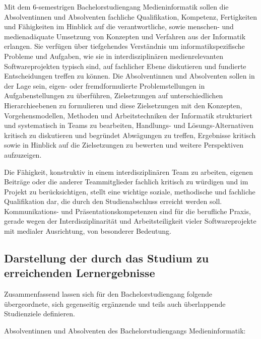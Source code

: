 Mit dem 6-semestrigen Bachelorstudiengang Medieninformatik sollen die
Absolventinnen und Absolventen fachliche Qualifikation, Kompetenz,
Fertigkeiten und Fähigkeiten im Hinblick auf die verantwortliche, sowie
menschen- und medienadäquate Umsetzung von Konzepten und Verfahren aus
der Informatik erlangen. Sie verfügen über tiefgehendes Verständnis um
informatikspezifische Probleme und Aufgaben, wie sie in
interdisziplinären medienrelevanten Softwareprojekten typisch sind, auf
fachlicher Ebene diskutieren und fundierte Entscheidungen treffen zu
können. Die Absolventinnen und Absolventen sollen in der Lage sein,
eigen- oder fremdformulierte Problemstellungen in Aufgabenstellungen zu
überführen, Zielsetzungen auf unterschiedlichen Hierarchieebenen zu
formulieren und diese Zielsetzungen mit den Konzepten,
Vorgehensmodellen, Methoden und Arbeitstechniken der Informatik
strukturiert und systematisch in Teams zu bearbeiten, Handlungs- und
Lösungs-Alternativen kritisch zu diskutieren und begründet Abwägungen zu
treffen, Ergebnisse kritisch sowie in Hinblick auf die Zielsetzungen zu
bewerten und weitere Perspektiven aufzuzeigen.

Die Fähigkeit, konstruktiv in einem interdisziplinären Team zu arbeiten,
eigenen Beiträge oder die anderer Teammitglieder fachlich kritisch zu
würdigen und im Projekt zu berücksichtigen, stellt eine wichtige
soziale, methodische und fachliche Qualifikation dar, die durch den
Studienabschluss erreicht werden soll. Kommunikations- und
Präsentationskompetenzen sind für die berufliche Praxis, gerade wegen
der Interdisziplinarität und Arbeitsteiligkeit vieler Softwareprojekte
mit medialer Ausrichtung, von besonderer Bedeutung.

\subsection{Darstellung der durch das Studium zu erreichenden
Lernergebnisse}\label{darstellung-der-durch-das-studium-zu-erreichenden-lernergebnisse}

Zusammenfassend lassen sich für den Bachelorstudiengang folgende
übergeordnete, sich gegenseitig ergänzende und teils auch überlappende
Studienziele definieren.

Absolventinnen und Absolventen des Bachelorstudiengangs
Medieninformatik:

